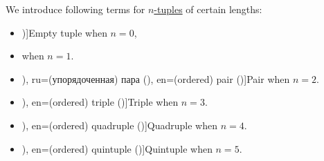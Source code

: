 \begin{definition}\label{def:ordered_tuple_length_terminology}
  We introduce following terms for \hyperref[def:ordered_tuple]{\( n \)-tuples} of certain lengths:
  \begin{itemize}
    \item \term[en=empty tuple (\cite[example 3.5.10]{Tao2022AnalysisI})]{Empty tuple} when \( n = 0 \),
    \item {} when \( n = 1 \).
    \item \term[bg=наредена двойка (\cite[367]{ГеновМиховскиМоллов1991Алгебра}), ru=(упорядоченная) пара (\cite[38]{БелоусовТкачёв2004ДискретнаяМатематика}), en=(ordered) pair (\cite[23]{Halmos1960NaiveSetTheory})]{Pair} when \( n = 2 \).
    \item \term[ru=(упорядоченная) тройка (\cite[39]{БелоусовТкачёв2004ДискретнаяМатематика}), en=(ordered) triple (\cite[42]{Enderton1977SetTheory})]{Triple} when \( n = 3 \).
    \item \term[ru=(упорядоченная) четвёрка (\cite[39]{БелоусовТкачёв2004ДискретнаяМатематика}), en=(ordered) quadruple (\cite[42]{Enderton1977SetTheory})]{Quadruple} when \( n = 4 \).
    \item \term[ru=(упорядоченная) пятёрка (\cite[39]{БелоусовТкачёв2004ДискретнаяМатематика}), en=(ordered) quintuple (\cite[42]{Enderton1977SetTheory})]{Quintuple} when \( n = 5 \).
  \end{itemize}
\end{definition}

